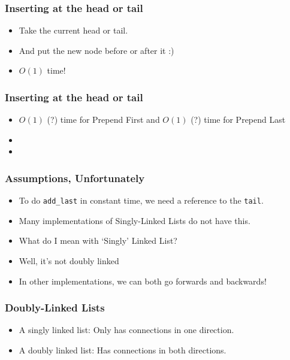 \begin{frame}
	\frametitle{Inserting at the head or tail}
	\begin{itemize}
		\item Take the current head or tail.
		\item And put the new node before or after it :)
		\item \alert{$O(1)$ time!}
	\end{itemize}	


\end{frame}

\begin{frame}
	\frametitle{Inserting at the head or tail}

		\begin{itemize}
			\item $O(1)$ (?) time for Prepend First and $O(1)$ (?) time for Prepend Last

		\item 
		
				
		\item 
	\end{itemize}	

\end{frame}

\begin{frame}
	\frametitle{Assumptions, Unfortunately}
	\begin{itemize}
		\item To do \texttt{add\_last} in constant time, we need a reference to the \texttt{tail}.
		\item Many implementations of Singly-Linked Lists do not have this.
		\item What do I mean with `Singly' Linked List?	
		\item Well, it's not doubly linked
		\item In other implementations, we can both go forwards and backwards!	
	\end{itemize}	

\end{frame}

\begin{frame}
	\frametitle{Doubly-Linked Lists}
	\begin{itemize}
		\item A singly linked list: 	Only has connections in one direction.	
		\item A doubly linked list: 	Has connections in both directions.
	\end{itemize}	

\end{frame}

